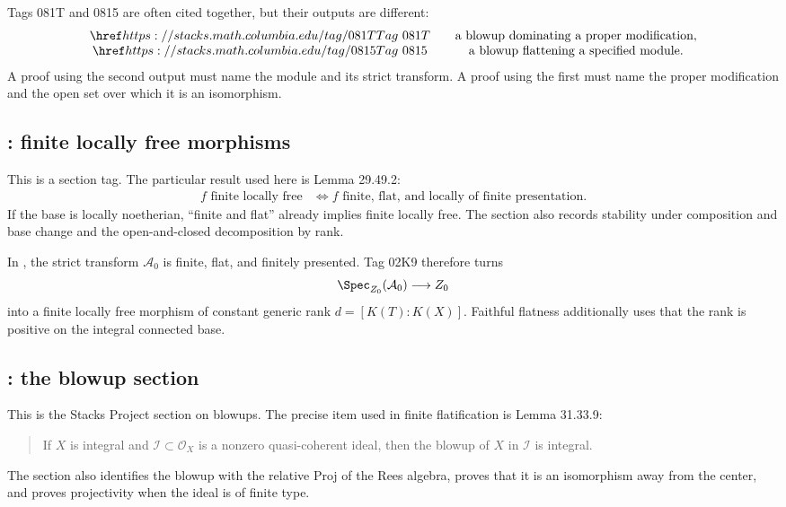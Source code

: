 \begin{remark}
\label{rem:stacks-two-blowup-theorems}
Tags 081T and 0815 are often cited together, but their outputs are different:
\[
\begin{array}{c@{\qquad}c}
\stacktag{081T}&\text{a blowup dominating a proper modification},\\
\stacktag{0815}&\text{a blowup flattening a specified module}.
\end{array}
\]
A proof using the second output must name the module and its strict
transform. A proof using the first must name the proper modification and
the open set over which it is an isomorphism.
\end{remark}

\subsection*{: finite locally free morphisms}
\label{sec:stacks-tag-02K9}

This is a section tag. The particular result used here is Lemma 29.49.2:
\[
\begin{split}
f\text{ finite locally free}
&\Longleftrightarrow
f\text{ finite, flat, and locally of finite presentation}.
\end{split}
\]
If the base is locally noetherian, “finite and flat” already implies
finite locally free. The section also records stability under composition
and base change and the open-and-closed decomposition by rank.

In , the strict transform
\(\mathcal A_0\) is finite, flat, and finitely presented. Tag 02K9
therefore turns
\[
                  \Spec_{Z_0}(\mathcal A_0)\longrightarrow Z_0
\]
into a finite locally free morphism of constant generic rank
\(d=[K(T):K(X)]\). Faithful flatness additionally uses that the rank is
positive on the integral connected base.

\subsection*{: the blowup section}
\label{sec:stacks-tag-01OF}

This is the Stacks Project section on blowups. The precise item used in
finite flatification is Lemma 31.33.9:
\begin{quote}
If \(X\) is integral and \(\mathcal I\subset\mathcal O_X\) is a nonzero
quasi-coherent ideal, then the blowup of \(X\) in \(\mathcal I\) is
integral.
\end{quote}
The section also identifies the blowup with the relative Proj of the Rees
algebra, proves that it is an isomorphism away from the center, and proves
projectivity when the ideal is of finite type.

